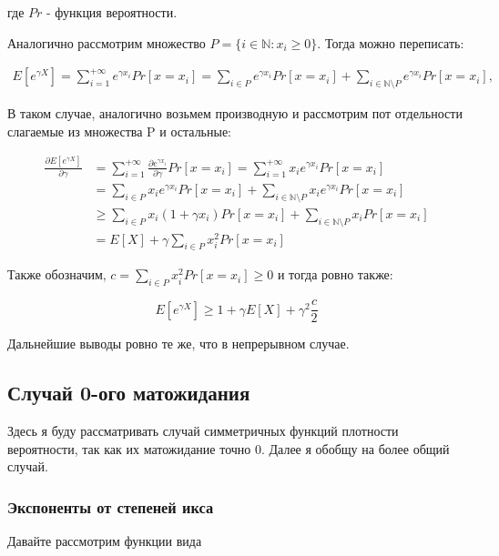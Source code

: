 \documentclass[12pt, a4paper]{article}
\theoremstyle{remark}
\begin{document}
где $Pr$ - функция вероятности.

\hfill

Аналогично рассмотрим множество $P = \{i \in \mathbb{N}: x_i \geq 0\}$. Тогда можно переписать: 

\begin{align*}
    E[e^{\gamma X}] = \sum_{i = 1}^{+\infty} e^{\gamma x_i} Pr[x = x_i] = \sum_{i \in P} e^{\gamma x_i} Pr[x = x_i] + \sum_{i \in \mathbb{N}\setminus P} e^{\gamma x_i} Pr[x = x_i],
\end{align*}

В таком случае, аналогично возьмем производную и рассмотрим пот отдельности слагаемые из множества P и остальные:

\begin{align*}
    \frac{\partial E[e^{\gamma X}]}{\partial \gamma} &= \sum_{i = 1}^{+\infty} \frac{\partial e^{\gamma x_i}}{\partial \gamma} Pr[x = x_i] = \sum_{i = 1}^{+\infty} x_i e^{\gamma x_i} Pr[x = x_i] \\
    &= \sum_{i \in P} x_i e^{\gamma x_i} Pr[x = x_i] + \sum_{i \in \mathbb{N}\setminus P} x_i e^{\gamma x_i} Pr[x = x_i] \\
    &\geq \sum_{i \in P} x_i (1 + {\gamma x_i}) Pr[x = x_i] + \sum_{i \in \mathbb{N}\setminus P} x_i Pr[x = x_i] \\
    &= E[X] + \gamma\sum_{i \in P} x_i^2 Pr[x = x_i]
\end{align*}

Также обозначим, $c = \sum_{i \in P} x_i^2 Pr[x = x_i] \geq 0$ и тогда ровно также: 

\[
E[e^{\gamma X}] \geq 1 + \gamma E[X] + \gamma^2 \frac{c}{2}  
\]

Дальнейшие выводы ровно те же, что в непрерывном случае.

\subsection*{Случай 0-ого матожидания}
\label{sec:zero}

Здесь я буду рассматривать случай симметричных функций плотности вероятности, так как их матожидание точно 0. Далее я обобщу на более общий случай.

\subsubsection*{Экспоненты от степеней икса}

Давайте рассмотрим функции вида
\end{document}
